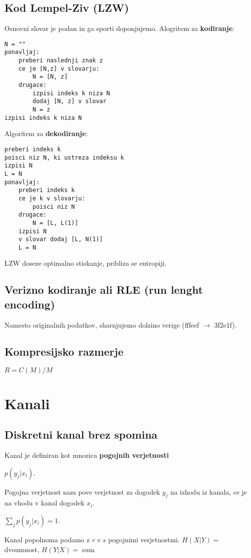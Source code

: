 \documentclass{article}
\begin{document}
\begin{multicols}{4}
\subsection{Kod Lempel-Ziv (LZW)}
Osnovni slovar je podan in ga sporti doponjujemo. Alogritem za \textbf{kodiranje}:
\begin{verbatim}
N = ""
ponavljaj:
    preberi naslednji znak z
    ce je [N,z] v slovarju:
        N = [N, z]
    drugace:
        izpisi indeks k niza N
        dodaj [N, z] v slovar
        N = z
izpisi indeks k niza N
\end{verbatim}
Algoritem za \textbf{dekodiranje}:
\begin{verbatim}
preberi indeks k
poisci niz N, ki ustreza indeksu k
izpisi N
L = N
ponavljaj:
    preberi indeks k
    ce je k v slovarju:
        poisci niz N
    drugace:
        N = [L, L(1)]
    izpisi N
    v slovar dodaj [L, N(1)]
    L = N
\end{verbatim}
LZW doseze optimalno stiskanje, pribliza se entropiji. %

\subsection{Verizno kodiranje ali RLE (run lenght encoding)} 
Namesto originalnih podatkov, sharnjujemo dolzino verige (fffeef $\rightarrow$ 3f2e1f).

\subsection{Kompresijsko razmerje}
\begin{center}
    \begin{math}
        R = C(M) / M
    \end{math}
\end{center}

\section{Kanali}

\subsection{Diskretni kanal brez spomina}
Kanal je definiran kot mnozica \textbf{pogojnih verjetnosti}
\begin{center}
    $p(y_j | x_i)$.
\end{center}
Pogojna verjetnost nam pove verjetnost za dogodek $y_j$ na izhodu iz kanala, ce je na vhodu v kanal dogodek $x_i$.
\begin{center}
    \begin{math}
        \sum_j p(y_j | x_i) = 1.
    \end{math} 
\end{center}
Kanal popolnoma podamo z $r \times s$ pogojnimi verjetnostmi.
$H(X|Y) =$ dvoumnost, $H(Y|X) =$ sum


\end{multicols}
\end{document}

